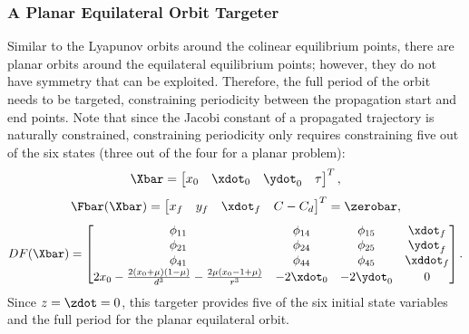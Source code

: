 \subsubsection{A Planar Equilateral Orbit Targeter}
Similar to the Lyapunov orbits around the colinear equilibrium points, there are planar orbits
around the equilateral equilibrium points; however, they do not have symmetry that can be
exploited. Therefore, the full period of the orbit needs to be targeted, constraining periodicity
between the propagation start and end points. Note that since the Jacobi constant of a propagated
trajectory is naturally constrained, constraining periodicity only requires constraining five out
of the six states (three out of the four for a planar problem):
\begin{equation}
    \Xbar=\begin{bmatrix}   x_{0}   &   \xdot_{0}   &   \ydot_{0}   &   \tau    \end{bmatrix}^{T},
    \label{eq:longfreevar}
\end{equation}
\begin{equation}
    \Fbar(\Xbar)=\begin{bmatrix}    x_{f}   &   y_{f}   &   \xdot_{f}   &   C-C_{d} \end{bmatrix}^{T}=\zerobar,
    \label{eq:longconst}
\end{equation}
\begin{equation}
    DF(\Xbar)=\begin{bmatrix}   \phi_{11}                                                                   &   \phi_{14}   &   \phi_{15}   &   \xdot_{f}   \\
                                \phi_{21}                                                                   &   \phi_{24}   &   \phi_{25}   &   \ydot_{f}   \\
                                \phi_{41}                                                                   &   \phi_{44}   &   \phi_{45}   &   \xddot_{f}  \\
                                2x_{0}-\frac{2(x_{0}+\mu)(1-\mu)}{d^{3}}-\frac{2\mu(x_{0}-1+\mu)}{r^{3}}    &   -2\xdot_{0} &   -2\ydot_{0} &   0           \end{bmatrix}.
    \label{eq:longjacobian}
\end{equation}
Since $z=\zdot=0$, this targeter provides five of the six initial state variables and the full
period for the planar equilateral orbit.

